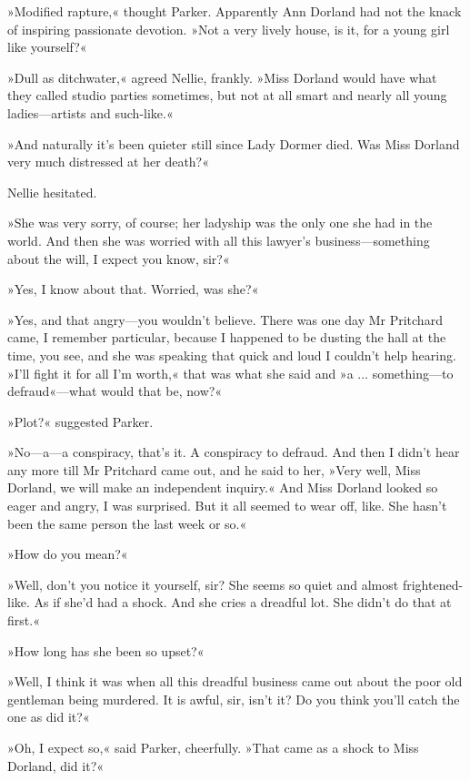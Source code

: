 »Modified rapture,« thought Parker. Apparently Ann Dorland had not the knack of inspiring passionate devotion. »Not a very lively house, is it, for a young girl like yourself?«

»Dull as ditchwater,« agreed Nellie, frankly. »Miss Dorland would have what they called studio parties sometimes, but not at all smart and nearly all young ladies\allowbreak---\allowbreak artists and such-like.«

»And naturally it's been quieter still since Lady Dormer died. Was Miss Dorland very much distressed at her death?«

Nellie hesitated.

»She was very sorry, of course; her ladyship was the only one she had in the world. And then she was worried with all this lawyer's business\allowbreak---\allowbreak something about the will, I expect you know, sir?«

»Yes, I know about that. Worried, was she?«

»Yes, and that angry\allowbreak---\allowbreak you wouldn't believe. There was one day Mr Pritchard came, I remember particular, because I happened to be dusting the hall at the time, you see, and she was speaking that quick and loud I couldn't help hearing. »I'll fight it for all I'm worth,« that was what she said and »a ... something\allowbreak---\allowbreak to defraud«---what would that be, now?«

»Plot?« suggested Parker.

»No\allowbreak---\allowbreak a---a conspiracy, that's it. A conspiracy to defraud. And then I didn't hear any more till Mr Pritchard came out, and he said to her, »Very well, Miss Dorland, we will make an independent inquiry.« And Miss Dorland looked so eager and angry, I was surprised. But it all seemed to wear off, like. She hasn't been the same person the last week or so.«

»How do you mean?«

»Well, don't you notice it yourself, sir? She seems so quiet and almost frightened-like. As if she'd had a shock. And she cries a dreadful lot. She didn't do that at first.«

»How long has she been so upset?«

»Well, I think it was when all this dreadful business came out about the poor old gentleman being murdered. It is awful, sir, isn't it? Do you think you'll catch the one as did it?«

»Oh, I expect so,« said Parker, cheerfully. »That came as a shock to Miss Dorland, did it?«

